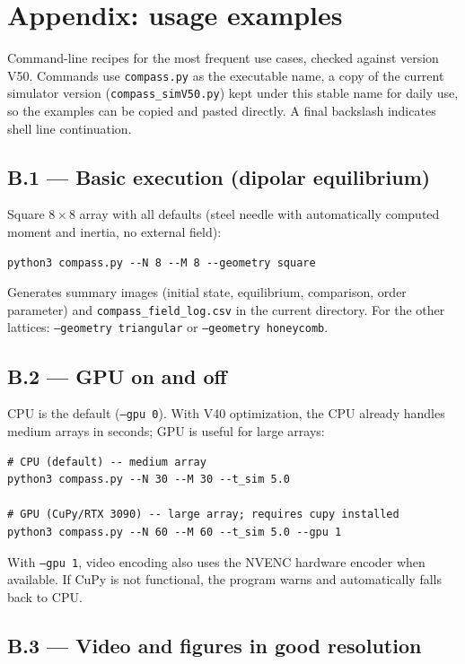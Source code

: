 \documentclass[11pt,a4paper]{article}
\newcommand{\code}[1]{\texttt{#1}}
\begin{document}
\section{Appendix: usage examples}
\label{app:exemplos}

Command-line recipes for the most frequent use cases, checked against version V50. Commands use \code{compass.py} as the executable name, a copy of the current simulator version (\code{compass\_simV50.py}) kept under this stable name for daily use, so the examples can be copied and pasted directly. A final backslash indicates shell line continuation.

\subsection*{B.1 --- Basic execution (dipolar equilibrium)}

Square $8\times8$ array with all defaults (steel needle with automatically computed moment and inertia, no external field):
\begin{verbatim}
python3 compass.py --N 8 --M 8 --geometry square
\end{verbatim}
Generates summary images (initial state, equilibrium, comparison, order parameter) and \code{compass\_field\_log.csv} in the current directory. For the other lattices: \code{--geometry triangular} or \code{--geometry honeycomb}.

\subsection*{B.2 --- GPU on and off}

CPU is the default (\code{--gpu 0}). With V40 optimization, the CPU already handles medium arrays in seconds; GPU is useful for large arrays:
\begin{verbatim}
# CPU (default) -- medium array
python3 compass.py --N 30 --M 30 --t_sim 5.0

# GPU (CuPy/RTX 3090) -- large array; requires cupy installed
python3 compass.py --N 60 --M 60 --t_sim 5.0 --gpu 1
\end{verbatim}
With \code{--gpu 1}, video encoding also uses the NVENC hardware encoder when available. If CuPy is not functional, the program warns and automatically falls back to CPU.

\subsection*{B.3 --- Video and figures in good resolution}
\end{document}
